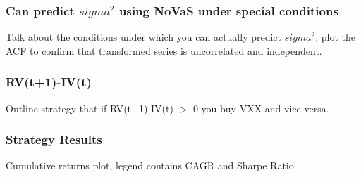 \documentclass{beamer}
\begin{document}
\begin{frame}
\frametitle{Can predict $sigma^2$ using NoVaS under special conditions}
Talk about the conditions under which you can actually predict $sigma^2$, plot the ACF to confirm that transformed series is uncorrelated and independent.
\end{frame}

\begin{frame}
\frametitle{RV(t+1)-IV(t)}
Outline strategy that if RV(t+1)-IV(t) $>$ 0 you buy VXX and vice versa.
\end{frame}

\begin{frame}
\frametitle{Strategy Results}
Cumulative returns plot, legend contains CAGR and Sharpe Ratio
\end{frame}
\end{document}
